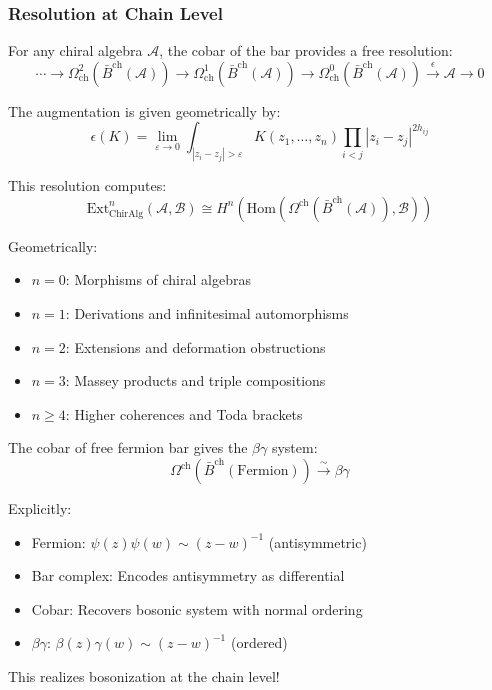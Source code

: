 \subsubsection{Resolution at Chain Level}

\begin{theorem}
For any chiral algebra $\mathcal{A}$, the cobar of the bar provides a free resolution:
$$\cdots \to \Omega^2_{\text{ch}}(\bar{B}^{\text{ch}}(\mathcal{A})) \to \Omega^1_{\text{ch}}(\bar{B}^{\text{ch}}(\mathcal{A})) \to \Omega^0_{\text{ch}}(\bar{B}^{\text{ch}}(\mathcal{A})) \xrightarrow{\epsilon} \mathcal{A} \to 0$$

The augmentation is given geometrically by:
$$\epsilon(K) = \lim_{\varepsilon \to 0} \int_{|z_i - z_j| > \varepsilon} K(z_1, \ldots, z_n) \prod_{i<j} |z_i - z_j|^{2h_{ij}}$$
\end{theorem}

\begin{remark}
This resolution computes:
$$\text{Ext}^n_{\text{ChirAlg}}(\mathcal{A}, \mathcal{B}) \cong H^n(\text{Hom}(\Omega^{\text{ch}}(\bar{B}^{\text{ch}}(\mathcal{A})), \mathcal{B}))$$

Geometrically:
\begin{itemize}
\item $n = 0$: Morphisms of chiral algebras
\item $n = 1$: Derivations and infinitesimal automorphisms
\item $n = 2$: Extensions and deformation obstructions
\item $n = 3$: Massey products and triple compositions
\item $n \geq 4$: Higher coherences and Toda brackets
\end{itemize}
\end{remark}

\begin{example}
The cobar of free fermion bar gives the $\beta\gamma$ system:
$$\Omega^{\text{ch}}(\bar{B}^{\text{ch}}(\text{Fermion})) \xrightarrow{\sim} \beta\gamma$$

Explicitly:
\begin{itemize}
\item Fermion: $\psi(z)\psi(w) \sim (z-w)^{-1}$ (antisymmetric)
\item Bar complex: Encodes antisymmetry as differential
\item Cobar: Recovers bosonic system with normal ordering
\item $\beta\gamma$: $\beta(z)\gamma(w) \sim (z-w)^{-1}$ (ordered)
\end{itemize}

This realizes bosonization at the chain level!
\end{example}


